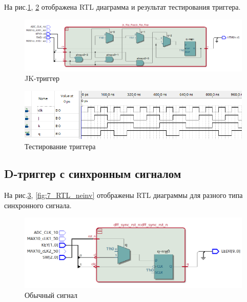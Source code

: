 \documentclass[a4paper,14pt]{article}
\begin{document}

На рис.\ref{fig:6_RTL_jk}, \ref{fig:6_wave_jk} отображена RTL диаграмма и результат тестирования триггера.

\begin{figure}[H]
	\centering
	\includegraphics[width=0.9\linewidth]{imgs/6_RTL_jk}
	\caption{JK-триггер}
	\label{fig:6_RTL_jk}
\end{figure}

\begin{figure}[H]
	\centering
	\includegraphics[width=0.9\linewidth]{imgs/6_wave_jk}
	\caption{Тестирование триггера}
	\label{fig:6_wave_jk}
\end{figure}


\subsection{D-триггер с синхронным сигналом}


На рис.\ref{fig:7_RTL_sample}, \ref{fig:7_RTL_neinv} отображены RTL диаграммы для разного типа синхронного сигнала. 

\begin{figure}[H]
	\centering
	\includegraphics[width=0.9\linewidth]{imgs/7_RTL_sample}
	\caption{Обычный сигнал}
	\label{fig:7_RTL_sample}
\end{figure}
\end{document}
